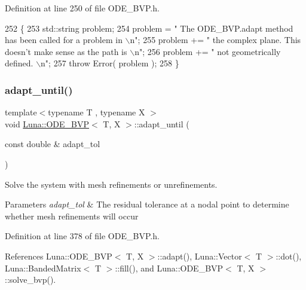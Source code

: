 Definition at line 250 of file O\+D\+E\+\_\+\+B\+V\+P.\+h.


\begin{DoxyCode}
252   \{
253     std::string problem;
254     problem = \textcolor{stringliteral}{" The ODE\_BVP.adapt method has been called for a problem in \(\backslash\)n"};
255     problem += \textcolor{stringliteral}{" the complex plane. This doesn't make sense as the path is \(\backslash\)n"};
256     problem += \textcolor{stringliteral}{" not geometrically defined. \(\backslash\)n"};
257     \textcolor{keywordflow}{throw} Error( problem );
258   \}
\end{DoxyCode}
\mbox{\label{classLuna_1_1ODE__BVP_a504f92ae04c8ab1ccd2b1ba96c09b79e}} 
\subsubsection{\texorpdfstring{adapt\+\_\+until()}{adapt\_until()}\hspace{0.1cm}{\footnotesize\ttfamily [1/3]}}
{\footnotesize\ttfamily template$<$typename T , typename X $>$ \\
void \hyperlink{classLuna_1_1ODE__BVP}{Luna\+::\+O\+D\+E\+\_\+\+B\+VP}$<$ T, X $>$\+::adapt\+\_\+until (\begin{DoxyParamCaption}\item[{const double \&}]{adapt\+\_\+tol }\end{DoxyParamCaption})}



Solve the system with mesh refinements or unrefinements. 


\begin{DoxyParams}{Parameters}
{\em adapt\+\_\+tol} & The residual tolerance at a nodal point to determine whether mesh refinements will occur \\
\hline
\end{DoxyParams}


Definition at line 378 of file O\+D\+E\+\_\+\+B\+V\+P.\+h.



References Luna\+::\+O\+D\+E\+\_\+\+B\+V\+P$<$ T, X $>$\+::adapt(), Luna\+::\+Vector$<$ T $>$\+::dot(), Luna\+::\+Banded\+Matrix$<$ T $>$\+::fill(), and Luna\+::\+O\+D\+E\+\_\+\+B\+V\+P$<$ T, X $>$\+::solve\+\_\+bvp().


